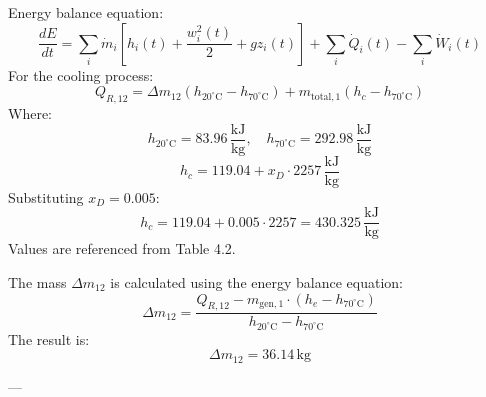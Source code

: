 Energy balance equation:  
\[
\frac{dE}{dt} = \sum_i \dot{m}_i \left[ h_i(t) + \frac{w_i^2(t)}{2} + g z_i(t) \right] + \sum_i \dot{Q}_i(t) - \sum_i \dot{W}_i(t)
\]  
For the cooling process:  
\[
Q_{R,12} = \Delta m_{12} \left( h_{20^\circ\text{C}} - h_{70^\circ\text{C}} \right) + m_{\text{total},1} \left( h_c - h_{70^\circ\text{C}} \right)
\]  
Where:  
\[
h_{20^\circ\text{C}} = 83.96 \, \frac{\text{kJ}}{\text{kg}}, \quad h_{70^\circ\text{C}} = 292.98 \, \frac{\text{kJ}}{\text{kg}}
\]  
\[
h_c = 119.04 + x_D \cdot 2257 \, \frac{\text{kJ}}{\text{kg}}
\]  
Substituting \( x_D = 0.005 \):  
\[
h_c = 119.04 + 0.005 \cdot 2257 = 430.325 \, \frac{\text{kJ}}{\text{kg}}
\]  
Values are referenced from Table 4.2.

The mass \( \Delta m_{12} \) is calculated using the energy balance equation:  
\[
\Delta m_{12} = \frac{Q_{R,12} - m_{\text{gen},1} \cdot (h_{e} - h_{70^\circ\text{C}})}{h_{20^\circ\text{C}} - h_{70^\circ\text{C}}}
\]  
The result is:  
\[
\Delta m_{12} = 36.14 \, \text{kg}
\]  

---